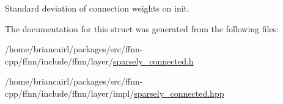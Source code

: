 Standard deviation of connection weights on init. 



The documentation for this struct was generated from the following files\-:\begin{DoxyCompactItemize}
\item 
/home/briancairl/packages/src/ffnn-\/cpp/ffnn/include/ffnn/layer/\hyperlink{sparsely__connected_8h}{sparsely\-\_\-connected.\-h}\item 
/home/briancairl/packages/src/ffnn-\/cpp/ffnn/include/ffnn/layer/impl/\hyperlink{layer_2impl_2sparsely__connected_8hpp}{sparsely\-\_\-connected.\-hpp}\end{DoxyCompactItemize}
